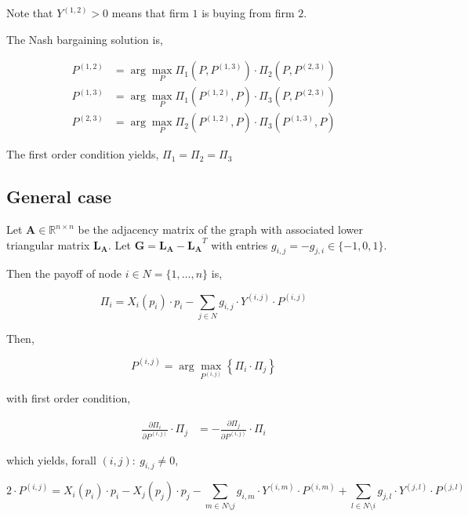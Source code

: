 \documentclass[american]{scrartcl}
\newcommand{\R}{\mathbb{R}}
\newcommand{\matr}[1]{\bm{#1}}
\begin{document}
Note that $Y^{(1, 2)} > 0$ means that firm $1$ is buying from firm $2$.

The Nash bargaining solution is,

\begin{equation*}
    \begin{split}
        P^{(1, 2)} &= \arg \max_P \Pi_1(P, P^{(1, 3)}) \cdot \Pi_2(P, P^{(2, 3)} ) \\
        P^{(1, 3)} &= \arg \max_P \Pi_1(P^{(1, 2)}, P) \cdot \Pi_3(P, P^{(2, 3)} ) \\
        P^{(2, 3)} &= \arg \max_P \Pi_2(P^{(1, 2)}, P) \cdot \Pi_3(P^{(1, 3)}, P)
    \end{split}
\end{equation*}

The first order condition yields, $\Pi_1 = \Pi_2 = \Pi_3$

\subsection{General case}

Let $\matr{A} \in \R^{n\times n}$ be the adjacency matrix of the graph with associated lower triangular matrix $\matr{L_A}$. Let $\matr{G} = \matr{L_A} - \matr{L_A}^T$ with entries $g_{i, j} = -g_{j, i} \in \{-1, 0, 1\}$.

Then the payoff of node $i \in N = \{1, \ldots, n\}$ is,

\begin{equation}
    \Pi_i = X_i(p_i)\cdot p_i - \sum_{j \in N} g_{i, j} \cdot Y^{(i, j)} \cdot P^{(i, j)}
\end{equation}

Then,

\begin{equation}
    P^{(i, j)} = \arg \max_{P^{(i, j)}} \left\{\Pi_i \cdot \Pi_j \right\}
\end{equation}

with first order condition,

\begin{equation}
    \begin{split}
        \frac{\partial\Pi_i}{\partial P^{(i, j)}} \cdot \Pi_j &= - \frac{\partial\Pi_j}{\partial P^{(i, j)}} \cdot \Pi_i
    \end{split}
\end{equation}

which yields, forall $(i, j) : \ g_{i, j} \neq 0$,

\begin{equation}
    2\cdot P^{(i, j)} = X_i(p_i)\cdot p_i - X_j(p_j)\cdot p_j - \sum_{m \in N\setminus j} g_{i, m} \cdot Y^{(i, m)} \cdot P^{(i, m)} + \sum_{l\in N\setminus i} g_{j, l} \cdot Y^{(j, l)} \cdot P^{(j, l)}
\end{equation}
\end{document}
